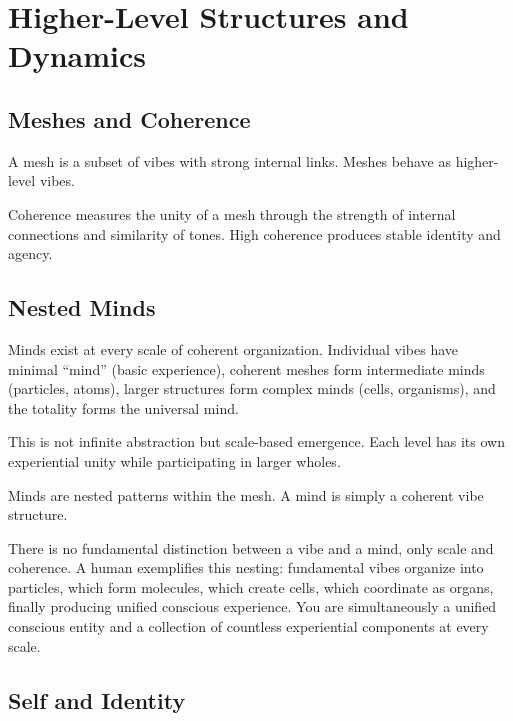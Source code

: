 \section{Higher-Level Structures and Dynamics}

\subsection{Meshes and Coherence}

\begin{definition}[Mesh]
A mesh is a subset of vibes with strong internal links. Meshes behave as higher-level vibes.
\end{definition}

Coherence measures the unity of a mesh through the strength of internal connections and similarity of tones. High coherence produces stable identity and agency.

\subsection{Nested Minds}

\begin{proposition}
Minds exist at every scale of coherent organization. Individual vibes have minimal ``mind'' (basic experience), coherent meshes form intermediate minds (particles, atoms), larger structures form complex minds (cells, organisms), and the totality forms the universal mind.
\end{proposition}

This is not infinite abstraction but scale-based emergence. Each level has its own experiential unity while participating in larger wholes.

Minds are nested patterns within the mesh. A mind is simply a coherent vibe structure.

There is no fundamental distinction between a vibe and a mind, only scale and coherence. A human exemplifies this nesting: fundamental vibes organize into particles, which form molecules, which create cells, which coordinate as organs, finally producing unified conscious experience. You are simultaneously a unified conscious entity and a collection of countless experiential components at every scale.

\subsection{Self and Identity}

